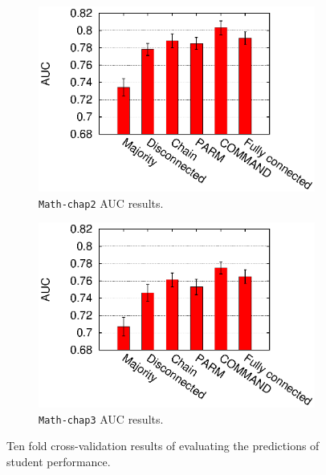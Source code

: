 \documentclass{edm_template}
\newcommand{\hl}[1]{\colorbox{yellow}{#1}}
\begin{document}
	\begin{figure}[!ht]
		\centering
		\begin{subfigure}[b]{0.48\linewidth}
			\centering
			\includegraphics[width=1.1\linewidth]{figures/hed_chap2_30_auc.eps}
			\caption{\texttt{Math-chap2} AUC results. }
			\label{fig:auc-chap2}
		\end{subfigure}
		\begin{subfigure}[b]{0.48\linewidth}
			\centering
			\includegraphics[width=1.1\linewidth]{figures/hed_chap3_33_auc.eps}
			\caption{\texttt{Math-chap3} AUC results.}
			\label{fig:auc-chap3}
		\end{subfigure}%
		\caption{Ten fold cross-validation results of evaluating the predictions of student performance. %
		\label{fig:aucs}
		}
	\end{figure} 	
	
\end{document}

